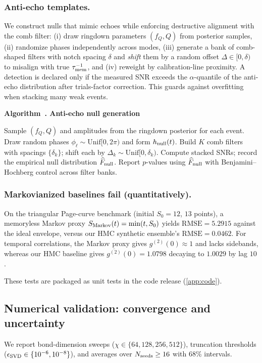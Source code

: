 \documentclass[aps,prd,preprint,onecolumn,superscriptaddress,nofootinbib,longbibliography,floatfix,11pt,showpacs,showkeys]{revtex4-2}
\newcounter{algorithm}
\newcommand{\algcaptionname}{Algorithm}
\newcommand{\hmcalgOldCaption}{}
\newenvironment{algorithm}[1][]{%
  \refstepcounter{algorithm}%
  \begin{infobox}%
  \let\hmcalgOldCaption\caption
  \renewcommand{\caption}[1]{\noindent\textbf{\algcaptionname~\thealgorithm. ##1}\\[0.6ex]}%
}{%
  \par\vspace{-0.4\baselineskip}%
  \let\caption\hmcalgOldCaption
  \end{infobox}%
}
\theoremstyle{plain}
\theoremstyle{definition}
\theoremstyle{remark}
\begin{document}
\subsubsection{Anti-echo templates.}
We construct nulls that mimic echoes while enforcing destructive alignment with the comb filter:
(i) draw ringdown parameters $(f_Q,Q)$ from posterior samples, (ii) randomize phases independently across modes,
(iii) generate a bank of comb-shaped filters with notch spacing $\delta$ and \emph{shift} them by a random offset
$\Delta\in[0,\delta)$ to misalign with true $\tau_{\rm mem}^{-1}$, and (iv) reweight by calibration-line proximity.
A detection is declared only if the measured SNR exceeds the $\alpha$-quantile of the anti-echo distribution after
trials-factor correction. This guards against overfitting when stacking many weak events.

\begin{algorithm}[t!]
\caption{Anti-echo null generation}
\label{alg:anti-echo}
\begin{algorithmic}[1]
\State Sample $(f_Q,Q)$ and amplitudes from the ringdown posterior for each event.
\State Draw random phases $\phi_\ell\sim\mathrm{Unif}[0,2\pi)$ and form $h_{\rm null}(t)$.
\State Build $K$ comb filters with spacings $\{\delta_k\}$; shift each by $\Delta_k\sim\mathrm{Unif}[0,\delta_k)$.
\State Compute stacked SNRs; record the empirical null distribution $\widehat{F}_{\rm null}$.
\State Report $p$-values using $\widehat{F}_{\rm null}$ with Benjamini--Hochberg control across filter banks.
\end{algorithmic}
\end{algorithm}

\subsubsection{Markovianized baselines fail (quantitatively).} On the triangular Page-curve benchmark (initial $S_0=12$, $13$ points), a memoryless Markov proxy $S_{\rm Markov}(t)=\min(t,S_0)$ yields $\mathrm{RMSE}=5.2915$ against the ideal envelope, versus our HMC synthetic ensemble's $\mathrm{RMSE}=0.0462$. For temporal correlations, the Markov proxy gives $g^{(2)}(0)\approx 1$ and lacks sidebands, whereas our HMC baseline gives $\overline{g^{(2)}}(0)=1.0798$ decaying to $1.0029$ by lag $10$.

These tests are packaged as unit tests in the code release (\cref{app:code}).


\subsection*{Numerical validation: convergence and uncertainty}
We report bond-dimension sweeps ($\chi\in\{64,128,256,512\}$), truncation thresholds
($\epsilon_{\rm SVD}\in\{10^{-6},10^{-8}\}$), and averages over $N_{\rm seeds}\ge 16$ with 68\% intervals.
\end{document}
